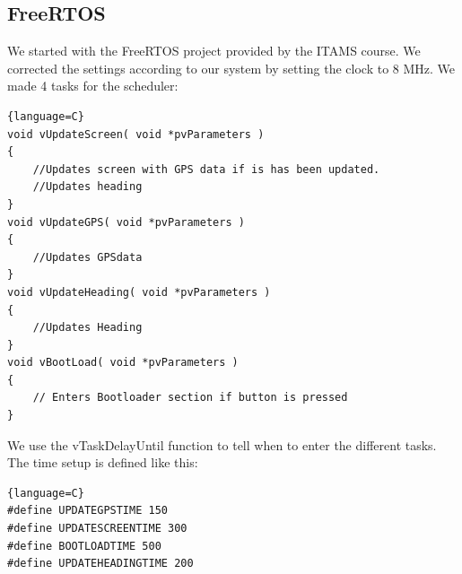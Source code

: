 \subsection{FreeRTOS}
We started with the FreeRTOS project provided by the ITAMS course. We corrected the settings according to our system by setting the clock to 8 MHz.  We made 4 tasks for the scheduler:
\begin{lstlisting}{language=C}
void vUpdateScreen( void *pvParameters )
{
	//Updates screen with GPS data if is has been updated.
	//Updates heading
}
void vUpdateGPS( void *pvParameters )
{
	//Updates GPSdata
}
void vUpdateHeading( void *pvParameters )
{
	//Updates Heading
}
void vBootLoad( void *pvParameters )
{
	// Enters Bootloader section if button is pressed
}
\end{lstlisting}
We use the vTaskDelayUntil function to tell when to enter the different tasks. The time setup is defined like this:
\begin{lstlisting}{language=C}
#define UPDATEGPSTIME 150
#define UPDATESCREENTIME 300
#define BOOTLOADTIME 500
#define UPDATEHEADINGTIME 200
\end{lstlisting}



